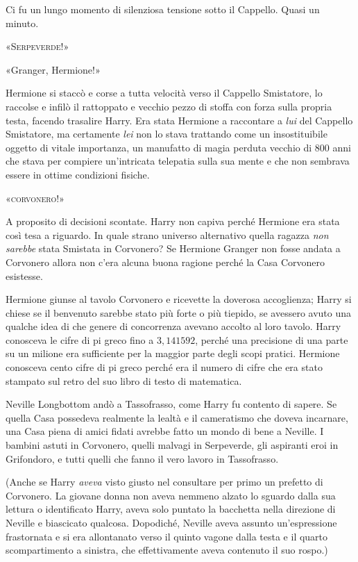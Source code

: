 Ci fu un lungo momento di silenziosa tensione sotto il Cappello. Quasi un minuto.

«\textsc{Serpeverde!}»

«Granger, Hermione!»

Hermione si staccò e corse a tutta velocità verso il Cappello Smistatore, lo raccolse e infilò il rattoppato e vecchio pezzo di stoffa con forza sulla propria testa, facendo trasalire Harry. Era stata Hermione a raccontare a \textit{lui} del Cappello Smistatore, ma certamente \textit{lei} non lo stava trattando come un insostituibile oggetto di vitale importanza, un manufatto di magia perduta vecchio di 800 anni che stava per compiere un’intricata telepatia sulla sua mente e che non sembrava essere in ottime condizioni fisiche.

«\textsc{corvonero!}»

A proposito di decisioni scontate. Harry non capiva perché Hermione era stata così tesa a riguardo. In quale strano universo alternativo quella ragazza \textit{non sarebbe} stata Smistata in Corvonero? Se Hermione Granger non fosse andata a Corvonero allora non c’era alcuna buona ragione perché la Casa Corvonero esistesse.

Hermione giunse al tavolo Corvonero e ricevette la doverosa accoglienza; Harry si chiese se il benvenuto sarebbe stato più forte o più tiepido, se avessero avuto una qualche idea di che genere di concorrenza avevano accolto al loro tavolo. Harry conosceva le cifre di pi greco fino a $3,141592$, perché una precisione di una parte su un milione era sufficiente per la maggior parte degli scopi pratici. Hermione conosceva cento cifre di pi greco perché era il numero di cifre che era stato stampato sul retro del suo libro di testo di matematica.

Neville Longbottom andò a Tassofrasso, come Harry fu contento di sapere. Se quella Casa possedeva realmente la lealtà e il cameratismo che doveva incarnare, una Casa piena di amici fidati avrebbe fatto un mondo di bene a Neville. I bambini astuti in Corvonero, quelli malvagi in Serpeverde, gli aspiranti eroi in Grifondoro, e tutti quelli che fanno il vero lavoro in Tassofrasso.

(Anche se Harry \textit{aveva} visto giusto nel consultare per primo un prefetto di Corvonero. La giovane donna non aveva nemmeno alzato lo sguardo dalla sua lettura o identificato Harry, aveva solo puntato la bacchetta nella direzione di Neville e biascicato qualcosa. Dopodiché, Neville aveva assunto un’espressione frastornata e si era allontanato verso il quinto vagone dalla testa e il quarto scompartimento a sinistra, che effettivamente aveva contenuto il suo rospo.)

